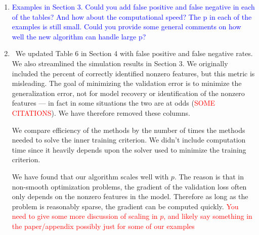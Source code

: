 \documentclass[]{article}
\newcommand{\point}[1]{\item \textcolor{blue}{#1}}
\newcommand{\reply}{\item[]\ }
\begin{document}
\begin{enumerate}
		\point{Examples in Section 3. Could you add false positive and false negative in each of the tables? And how about the computational speed? The p in each of the examples is still small. Could you provide some general comments on how well the new algorithm can handle large p?}
		
		\reply We updated Table 6 in Section 4 with false positive and false negative rates. We also streamlined the simulation results in Section 3. We originally included the percent of correctly identified nonzero features, but this metric is misleading. The goal of minimizing the validation error is to minimize the generalization error, not for model recovery or identification of the nonzero features --- in fact in some situations the two are at odds (\textcolor{red}{SOME CITATIONS}). We have therefore removed these columns.
		
		We compare efficiency of the methods by the number of times the methods needed to solve the inner training criterion. We didn't include computation time since it heavily depends upon the solver used to minimize the training criterion.
		
		We have found that our algorithm scales well with $p$. The reason is that in non-smooth optimization problems, the gradient of the validation loss often only depends on the nonzero features in the model. Therefore as long as the problem is reasonably sparse, the gradient can be computed quickly. \textcolor{red}{You need to give some more discussion of scaling in $p$, and likely say something in the paper/appendix possibly just for some of our examples}
		
	\end{enumerate}
\end{document}
